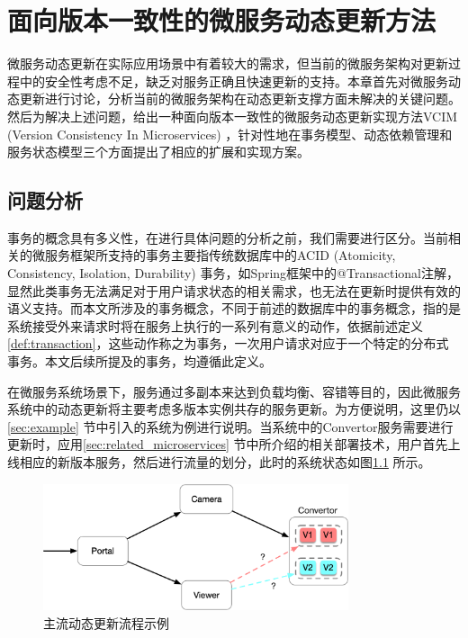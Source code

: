 \documentclass[macfonts,master]{njuthesis}
\begin{document}
\chapter{面向版本一致性的微服务动态更新方法}\label{chapter_3}
微服务动态更新在实际应用场景中有着较大的需求，但当前的微服务架构对更新过程中的安全性考虑不足，缺乏对服务正确且快速更新的支持。本章首先对微服务动态更新进行讨论，分析当前的微服务架构在动态更新支撑方面未解决的关键问题。然后为解决上述问题，给出一种面向版本一致性的微服务动态更新实现方法VCIM (Version Consistency In Microservices) ，针对性地在事务模型、动态依赖管理和服务状态模型三个方面提出了相应的扩展和实现方案。

\section{问题分析}
事务的概念具有多义性，在进行具体问题的分析之前，我们需要进行区分。当前相关的微服务框架所支持的事务主要指传统数据库中的ACID (Atomicity, Consistency, Isolation,
Durability) 事务，如Spring框架中的@Transactional注解，显然此类事务无法满足对于用户请求状态的相关需求，也无法在更新时提供有效的语义支持。而本文所涉及的事务概念，不同于前述的数据库中的事务概念，指的是系统接受外来请求时将在服务上执行的一系列有意义的动作，依据前述定义\ref{def:transaction}，这些动作称之为事务，一次用户请求对应于一个特定的分布式事务。本文后续所提及的事务，均遵循此定义。

在微服务系统场景下，服务通过多副本来达到负载均衡、容错等目的，因此微服务系统中的动态更新将主要考虑多版本实例共存的服务更新。为方便说明，这里仍以\ref{sec:example} 节中引入的系统为例进行说明。当系统中的Convertor服务需要进行更新时，应用\ref{sec:related_microservices} 节中所介绍的相关部署技术，用户首先上线相应的新版本服务，然后进行流量的划分，此时的系统状态如图\ref{fig:normal_v1v2} 所示。

\begin{figure}[!htbp]
  \centering
  \includegraphics[width= 0.8\textwidth]{image/normal_v1v2.png}
  \caption{主流动态更新流程示例}
  \label{fig:normal_v1v2}
\end{figure}
\end{document}
